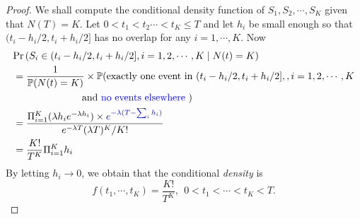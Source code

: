 \documentclass[english,10pt]{beamer}
\begin{document}
\frame
{
\begin{proof}
We shall compute the conditional density function of 
$S_1,S_2,\cdots,S_K$ given that $N(T)=K$.
Let $0<t_1<t_2\cdots<t_K\leq  T$ and let 
$h_i$ be small enough so that $(t_i-h_i/2 , t_{i}+h_i/2]$
has no overlap for any $ i = 1,\cdots,K$.
Now 
\[
\begin{split}
&{\Pr\left( S_i \in (t_i-h_i/2, t_i+h_i/2], i=1,2,\cdots,K \mid N(t)=K\right)}\\
&= \frac{1}{\mathbb{P}(N(t)=K)}\times
\mathbb{P}( \mbox{exactly one event in }   (t_i-h_i/2, t_i+h_i/2] ,, i=1,2,\cdots,K  
\\
& ~~\qquad \qquad\qquad~  \mbox{and  {\color{blue}{no events elsewhere}} }) \\
&= \frac{   \Pi_{i=1}^K (\lambda h_i e^{-\lambda h_i})   \times  {\color{blue}{e^{-\lambda (T -\sum_i h_i)}}}}
{e^{-\lambda T} (\lambda T)^K / K!}\\
&= \frac{K!}{T^K} \Pi_{i=1}^K    h_i
\end{split}
\]
By letting $h_i\to 0$, we obtain that the conditional {\it density} is
\[ f(t_1,\cdots, t_K) =\frac{K!}{T^K}, ~~0<t_1<\cdots<t_K<T. \]

\end{proof}


}

\end{document}
